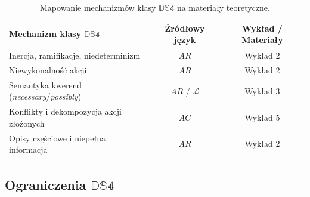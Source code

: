 \documentclass[11pt,a4paper]{article}
\theoremstyle{definition}
\begin{document}
\begin{table}[h!]
\centering
\caption{Mapowanie mechanizmów klasy $\mathbb{DS4}$ na materiały teoretyczne.}
\label{tab:mapowanie_ds4}
\begin{tabular}{|l|c|c|}
\hline
\textbf{Mechanizm klasy $\mathbb{DS4}$} & \textbf{Źródłowy język} & \textbf{Wykład / Materiały} \\ \hline
Inercja, ramifikacje, niedeterminizm & $AR$ & Wykład 2 \\ \hline
Niewykonalność akcji & $AR$ & Wykład 2 \\ \hline
Semantyka kwerend (\textit{necessary}/\textit{possibly}) & $AR$ / $\mathcal{L}$ & Wykład 3 \\ \hline
Konflikty i dekompozycja akcji złożonych & $AC$ & Wykład 5 \\ \hline
Opisy częściowe i niepełna informacja & $AR$ & Wykład 2 \\ \hline
\end{tabular}
\end{table}

\subsection{Ograniczenia \texorpdfstring{$\mathbb{DS4}$}{DS4}}
\end{document}
